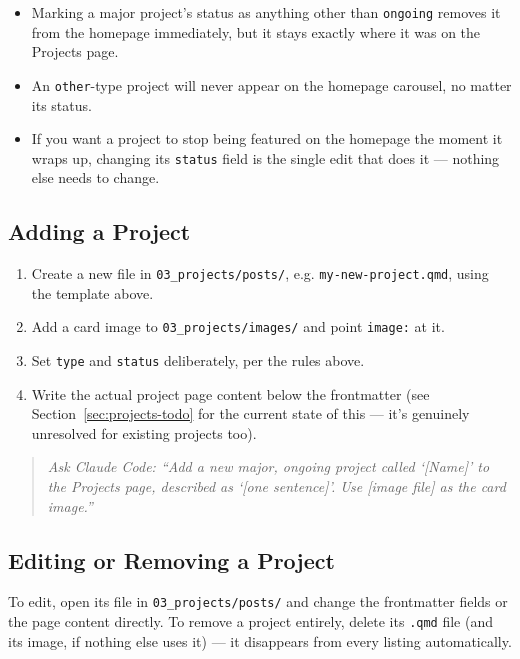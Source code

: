 \documentclass[11pt]{article}
\newcommand{\file}[1]{\texttt{#1}}
\newcommand{\cmd}[1]{\texttt{#1}}
\begin{document}
\begin{itemize}
    \item Marking a major project's status as anything other than
    \cmd{ongoing} removes it from the homepage immediately, but it
    stays exactly where it was on the Projects page.
    \item An \cmd{other}-type project will never appear on the homepage
    carousel, no matter its status.
    \item If you want a project to stop being featured on the homepage
    the moment it wraps up, changing its \file{status} field is the
    single edit that does it --- nothing else needs to change.
\end{itemize}

\subsection{Adding a Project}

\begin{enumerate}
    \item Create a new file in \file{03\_projects/posts/}, e.g.
    \file{my-new-project.qmd}, using the template above.
    \item Add a card image to \file{03\_projects/images/} and point
    \file{image:} at it.
    \item Set \file{type} and \file{status} deliberately, per the rules
    above.
    \item Write the actual project page content below the frontmatter
    (see Section~\ref{sec:projects-todo} for the current state of this
    --- it's genuinely unresolved for existing projects too).
\end{enumerate}

\begin{quote}
\textit{Ask Claude Code: ``Add a new major, ongoing project called
`[Name]' to the Projects page, described as `[one sentence]'. Use
[image file] as the card image.''}
\end{quote}

\subsection{Editing or Removing a Project}

To edit, open its file in \file{03\_projects/posts/} and change the
frontmatter fields or the page content directly. To remove a project
entirely, delete its \file{.qmd} file (and its image, if nothing else
uses it) --- it disappears from every listing automatically.
\end{document}

